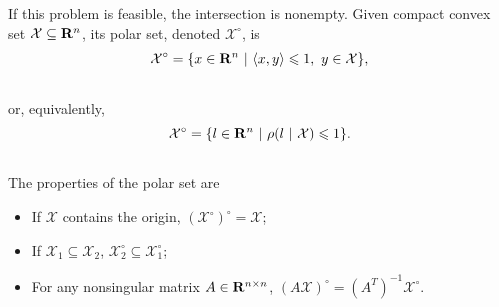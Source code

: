 \documentclass[letterpaper,10pt,english]{sphinxmanual}
\begin{document}
If this problem is feasible, the intersection is nonempty. Given
compact convex set ${\mathcal X}\subseteq{\bf R}^n$, its polar
set, denoted ${\mathcal X}^\circ$, is
\begin{gather}
\begin{split}{\mathcal X}^\circ = \{x\in{\bf R}^n ~|~ \langle x,y\rangle\leqslant1, ~ y\in{\mathcal X}\},\end{split}\notag\\\begin{split}\end{split}\notag
\end{gather}
or, equivalently,
\begin{gather}
\begin{split}{\mathcal X}^\circ = \{l\in{\bf R}^n ~|~ \rho(l ~|~ {\mathcal X})\leqslant1\}.\end{split}\notag\\\begin{split}\end{split}\notag
\end{gather}
The properties of the polar set are
\begin{itemize}
\item {} 
If ${\mathcal X}$ contains the origin,
$({\mathcal X}^\circ)^\circ = {\mathcal X}$;

\item {} 
If ${\mathcal X}_1\subseteq{\mathcal X}_2$,
${\mathcal X}_2^\circ\subseteq{\mathcal X}_1^\circ$;

\item {} 
For any nonsingular matrix $A\in{\bf R}^{n\times n}$,
$(A{\mathcal X})^\circ = (A^T)^{-1}{\mathcal X}^\circ$.

\end{itemize}
\end{document}
